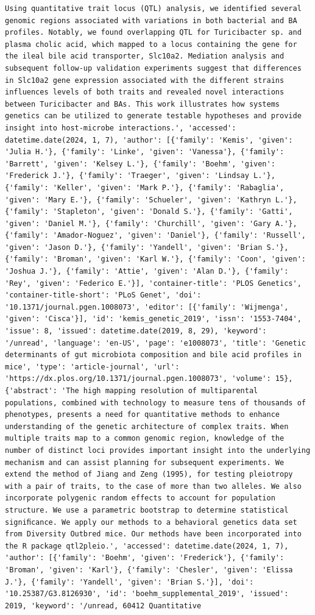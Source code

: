 \documentclass[
  12pt,
]
{article}
\begin{document}
\begin{verbatim}
Using quantitative trait locus (QTL) analysis, we identified several genomic regions associated with variations in both bacterial and BA profiles. Notably, we found overlapping QTL for Turicibacter sp. and plasma cholic acid, which mapped to a locus containing the gene for the ileal bile acid transporter, Slc10a2. Mediation analysis and subsequent follow-up validation experiments suggest that differences in Slc10a2 gene expression associated with the different strains influences levels of both traits and revealed novel interactions between Turicibacter and BAs. This work illustrates how systems genetics can be utilized to generate testable hypotheses and provide insight into host-microbe interactions.', 'accessed': datetime.date(2024, 1, 7), 'author': [{'family': 'Kemis', 'given': 'Julia H.'}, {'family': 'Linke', 'given': 'Vanessa'}, {'family': 'Barrett', 'given': 'Kelsey L.'}, {'family': 'Boehm', 'given': 'Frederick J.'}, {'family': 'Traeger', 'given': 'Lindsay L.'}, {'family': 'Keller', 'given': 'Mark P.'}, {'family': 'Rabaglia', 'given': 'Mary E.'}, {'family': 'Schueler', 'given': 'Kathryn L.'}, {'family': 'Stapleton', 'given': 'Donald S.'}, {'family': 'Gatti', 'given': 'Daniel M.'}, {'family': 'Churchill', 'given': 'Gary A.'}, {'family': 'Amador-Noguez', 'given': 'Daniel'}, {'family': 'Russell', 'given': 'Jason D.'}, {'family': 'Yandell', 'given': 'Brian S.'}, {'family': 'Broman', 'given': 'Karl W.'}, {'family': 'Coon', 'given': 'Joshua J.'}, {'family': 'Attie', 'given': 'Alan D.'}, {'family': 'Rey', 'given': 'Federico E.'}], 'container-title': 'PLOS Genetics', 'container-title-short': 'PLoS Genet', 'doi': '10.1371/journal.pgen.1008073', 'editor': [{'family': 'Wijmenga', 'given': 'Cisca'}], 'id': 'kemis_genetic_2019', 'issn': '1553-7404', 'issue': 8, 'issued': datetime.date(2019, 8, 29), 'keyword': '/unread', 'language': 'en-US', 'page': 'e1008073', 'title': 'Genetic determinants of gut microbiota composition and bile acid profiles in mice', 'type': 'article-journal', 'url': 'https://dx.plos.org/10.1371/journal.pgen.1008073', 'volume': 15}, {'abstract': 'The high mapping resolution of multiparental populations, combined with technology to measure tens of thousands of phenotypes, presents a need for quantitative methods to enhance understanding of the genetic architecture of complex traits. When multiple traits map to a common genomic region, knowledge of the number of distinct loci provides important insight into the underlying mechanism and can assist planning for subsequent experiments. We extend the method of Jiang and Zeng (1995), for testing pleiotropy with a pair of traits, to the case of more than two alleles. We also incorporate polygenic random effects to account for population structure. We use a parametric bootstrap to determine statistical signiﬁcance. We apply our methods to a behavioral genetics data set from Diversity Outbred mice. Our methods have been incorporated into the R package qtl2pleio.', 'accessed': datetime.date(2024, 1, 7), 'author': [{'family': 'Boehm', 'given': 'Frederick'}, {'family': 'Broman', 'given': 'Karl'}, {'family': 'Chesler', 'given': 'Elissa J.'}, {'family': 'Yandell', 'given': 'Brian S.'}], 'doi': '10.25387/G3.8126930', 'id': 'boehm_supplemental_2019', 'issued': 2019, 'keyword': '/unread, 60412 Quantitative 
\end{verbatim}
\end{document}
